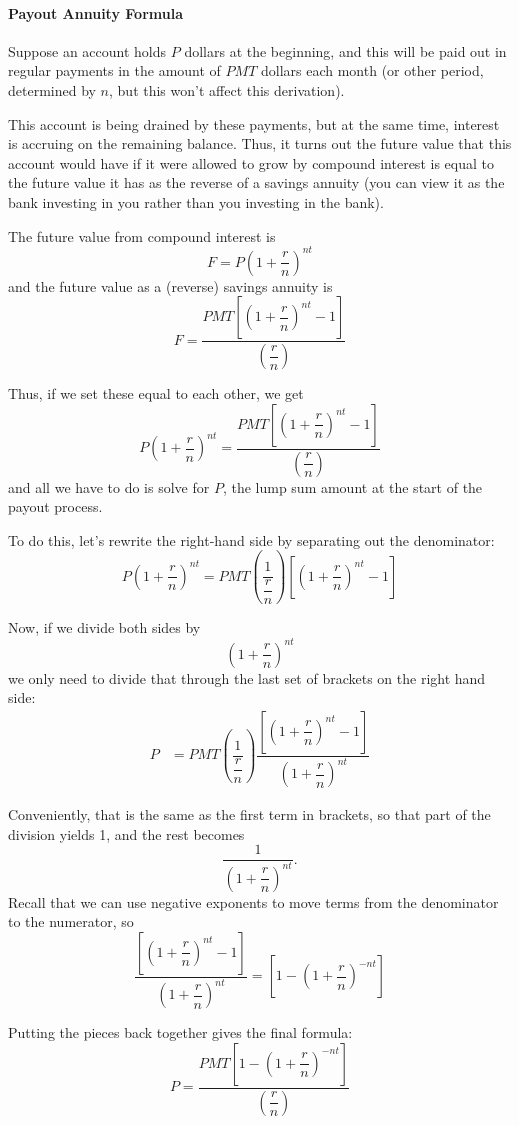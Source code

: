 \paragraph{Payout Annuity Formula}
Suppose an account holds $P$ dollars at the beginning, and this will be paid out in regular payments in the amount of $PMT$ dollars each month (or other period, determined by $n$, but this won't affect this derivation).

This account is being drained by these payments, but at the same time, interest is accruing on the remaining balance.  Thus, it turns out the future value that this account would have if it were allowed to grow by compound interest is equal to the future value it has as the reverse of a savings annuity (you can view it as the bank investing in you rather than you investing in the bank).

The future value from compound interest is \[F = P\left(1 + \dfrac{r}{n}\right)^{nt}\]
and the future value as a (reverse) savings annuity is \[F=\dfrac{PMT\left[\left(1+\dfrac{r}{n}\right)^{nt}-1\right]}{\left(\dfrac{r}{n}\right)}\]

Thus, if we set these equal to each other, we get
\[P\left(1 + \dfrac{r}{n}\right)^{nt}=\dfrac{PMT\left[\left(1+\dfrac{r}{n}\right)^{nt}-1\right]}{\left(\dfrac{r}{n}\right)}\]
and all we have to do is solve for $P$, the lump sum amount at the start of the payout process.

To do this, let's rewrite the right-hand side by separating out the denominator:
\[P\left(1 + \dfrac{r}{n}\right)^{nt}=PMT\left(\dfrac{1}{\dfrac{r}{n}}\right)\left[\left(1+\dfrac{r}{n}\right)^{nt}-1\right]\]

Now, if we divide both sides by \[\left(1 + \dfrac{r}{n}\right)^{nt}\] we only need to divide that through the last set of brackets on the right hand side:
\begin{align*}
P &= PMT\left(\dfrac{1}{\dfrac{r}{n}}\right)\dfrac{\left[\left(1+\dfrac{r}{n}\right)^{nt}-1\right]}{\left(1 + \dfrac{r}{n}\right)^{nt}}
\end{align*}

Conveniently, that is the same as the first term in brackets, so that part of the division yields 1, and the rest becomes \[\dfrac{1}{\left(1 + \dfrac{r}{n}\right)^{nt}}.\]
Recall that we can use negative exponents to move terms from the denominator to the numerator, so
\[\dfrac{\left[\left(1+\dfrac{r}{n}\right)^{nt}-1\right]}{\left(1 + \dfrac{r}{n}\right)^{nt}} = \left[1-\left(1 + \dfrac{r}{n}\right)^{-nt}\right]\]

Putting the pieces back together gives the final formula:
\[\boxed{P = \dfrac{PMT\left[1-\left(1+\dfrac{r}{n}\right)^{-nt}\right]}{\left(\dfrac{r}{n}\right)}}\]